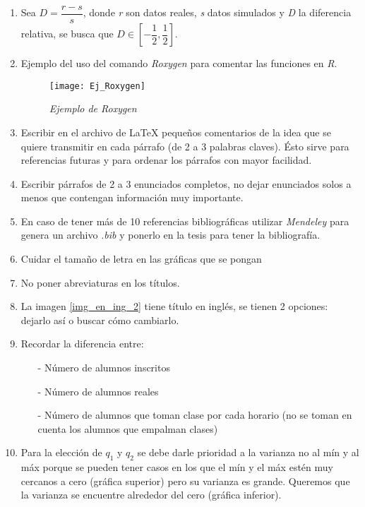 \begin{appendices}
\begin{enumerate}
  \item Sea $D = \dfrac{r - s}{s}$, donde \textit{r} son datos reales, \textit{s} datos simulados y \textit{D} la diferencia relativa, se busca que $D \in \left[ -\dfrac{1}{2},\dfrac{1}{2}\right]$. 
  
  \item Ejemplo del uso del comando \textit{Roxygen} para comentar las funciones en \textit{R}.
\begin{figure}[H]
\centering
\texttt{[image: Ej\_Roxygen]} %
\caption{\textit{Ejemplo de Roxygen}}
\end{figure}

  \item Escribir en el archivo de LaTeX pequeños comentarios de la idea que se quiere transmitir en cada párrafo (de 2 a 3 palabras claves). Ésto sirve para referencias futuras y para ordenar los párrafos con mayor facilidad.
  
  \item Escribir párrafos de 2 a 3 enunciados completos, no dejar enunciados solos a menos que contengan información muy importante.
  
  \item En caso de tener más de 10 referencias bibliográficas utilizar \textit{Mendeley} para genera un archivo \textit{.bib} y  ponerlo en la tesis para tener la bibliografía.
  
  \item Cuidar el tamaño de letra en las gráficas que se pongan
  
  \item No poner abreviaturas en los títulos.
  
  \item La imagen \ref{img_en_ing_2} tiene título en inglés, se tienen 2 opciones: dejarlo así o buscar cómo cambiarlo.
  
  \item Recordar la diferencia entre:
  \begin{itemize}
  	\item[-] Número de alumnos inscritos
  	
  	\item[-] Número de alumnos reales
  	
  	\item[-] Número de alumnos que toman clase por cada horario (no se toman en cuenta los alumnos que empalman clases)
  \end{itemize}
  
  \item Para la elección de $q_{1}$ y $q_{2}$ se debe darle prioridad a la varianza no al mín y al máx porque se pueden tener casos en los que el mín y el máx estén muy cercanos a cero (gráfica superior) pero su varianza es grande. Queremos que la varianza se encuentre alrededor del cero (gráfica inferior).


\end{enumerate}
\end{appendices}
